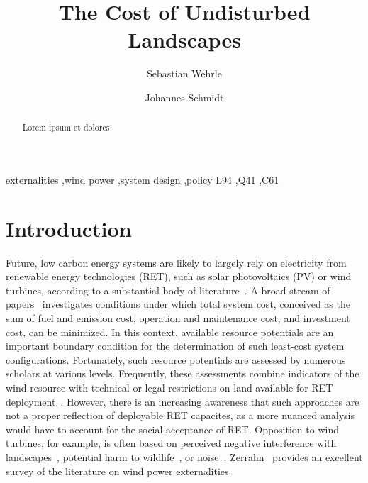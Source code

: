 \documentclass[review, 3p, times]{elsarticle} %
\begin{document}
    \begin{frontmatter}
        \title{The Cost of Undisturbed Landscapes}
        \author[1]{Sebastian Wehrle}
        \author[1]{Johannes Schmidt}
        \address[1]{Institute for Sustainable Economic Development, University of Natural Resources and Life Sciences,
        Feistmantelstrasse 4, 1180 Vienna, Austria}

        \begin{abstract}
            Lorem ipsum et dolores
        \end{abstract}

        \begin{keyword}
            externalities \sep wind power \sep system design \sep policy
            \JEL L94 \sep Q41 \sep C61
        \end{keyword}
    \end{frontmatter}
    \newpage



    \section{Introduction} \label{sec:introduction}
    Future, low carbon energy systems are likely to largely rely on electricity from renewable energy technologies
    (RET), such as solar photovoltaics (PV) or wind turbines, according to a substantial body of
    literature~\citep[e.g.][]{Becker2014,Delucchi2011,Fernandes2014,Gils2017,Jacobson2011,Schmidt2016}.
    A broad stream of papers~\citep[e.g.][]{Brown2018,Rodriguez2015,Schlachtberger2018,Scholz2017} investigates
    conditions under which total system cost, conceived as the sum of fuel and emission cost, operation and maintenance
    cost, and investment cost, can be minimized.
    In this context, available resource potentials are an important boundary condition for the determination of such
    least-cost system configurations.
    Fortunately, such resource potentials are assessed by numerous scholars at various levels.
    Frequently, these assessments combine indicators of the wind resource with technical or legal restrictions on land
    available for RET deployment~\citep[e.g.][]{Bosch2017,McKenna2015,Ryberg2020}.
    However, there is an increasing awareness that such approaches are not a proper reflection of deployable RET
    capacites, as a more nuanced analysis would have to account for the social acceptance of RET.
    Opposition to wind turbines, for example, is often based on perceived negative interference with
    landscapes~\cite{Mattmann2016}, potential harm to wildlife~\cite{Loss2013, Voigt2015, Wang2015}, or
    noise~\cite{Wang2015a}.
    Zerrahn~\cite{Zerrahn2017} provides an excellent survey of the literature on wind power externalities.
\end{document}
